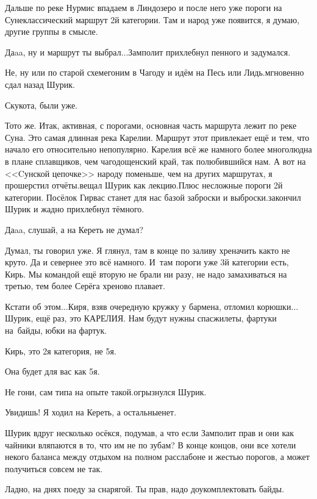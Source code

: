\diagdash Дальше по реке Нурмис впадаем в Линдозеро и после него уже пороги на Суне\mdash классический маршрут 2\sdash й категории. Там и народ уже появится, я думаю, другие группы в смысле.

\diagdash Да\sdash a\sdash a, ну и маршрут ты выбрал$\ldots$\mdash Замполит прихлебнул пенного и задумался.

\diagdash Не, ну или по старой схеме\mdash гоним в Чагоду и идём на Песь или Лидь.\mdash мгновенно сдал назад Шурик.

\diagdash Скукота, были уже.

\diagdash То\sdash то же. Итак, активная, с порогами, основная часть маршрута лежит по реке Суна. Это самая длинная река Карелии. Маршрут этот привлекает ещё и тем, что начало его относительно непопулярно. Карелия всё же намного более многолюдна в плане сплавщиков, чем чагодощенский край, так полюбившийся нам. А вот на <<Cунской цепочке>> народу поменьше, чем на других маршрутах, я прошерстил отчёты.\mdash вещал Шурик как лекцию.\mdash Плюс несложные пороги 2\sdash й категории. Посёлок Гирвас станет для нас базой заброски и выброски.\mdash закончил Шурик и жадно прихлебнул тёмного.

\diagdash Да\sdash a\sdash a, слушай, а на Кереть не думал?

\diagdash Думал, ты говорил уже. Я глянул, там в конце по заливу хреначить как\sdash то не круто. Да и севернее это всё намного. И~там пороги уже 3\sdash й категории есть, Кирь. Мы командой ещё вторую не брали ни разу, не надо замахиваться на третью, тем более Серёга хреново плавает. 

\diagdash Кстати об этом$\ldots$\mdash Киря, взяв очередную кружку у бармена, отломил корюшки\mdash $\ldots$Шурик, ещё раз, это КАРЕЛИЯ. Нам будут нужны спасжилеты, фартуки на~байды, юбки на фартук.

\diagdash Кирь, это 2\sdash я категория, не 5\sdash я.

\diagdash Она будет для вас как 5\sdash я.

\diagdash Не гони, сам типа на опыте такой.\mdash огрызнулся Шурик.

\diagdash Увидишь! Я ходил на Кереть, а остальные\mdash нет.

Шурик вдруг несколько осёкся, подумав, а что если Замполит прав и они как чайники вляпаются в то, что им не по зубам? В конце концов, они все хотели некого баланса между отдыхом на полном расслабоне и жестью порогов, а может получиться совсем не так.

\diagdash Ладно, на днях поеду за снарягой. Ты прав, надо доукомплектовать байды.

